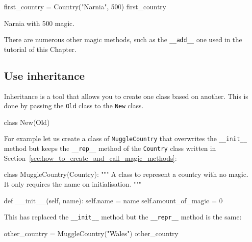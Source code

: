 \begin{pyin}
first_country = Country("Narnia", 500)
first_country
\end{pyin}





\begin{raw}
Narnia with 500 magic.
\end{raw}





There are numerous other magic methods, such as the \texttt{\_\_add\_\_} one used in
the tutorial of this Chapter.


\subsection{Use inheritance}
\label{sec:how_to_use_inheritance}

Inheritance is a tool that allows you to create one class based on another. This
is done by passing the \texttt{Old} class to the \texttt{New} class.


\begin{pyin}
class New(Old)
\end{pyin}



For example let us create a class of \texttt{MuggleCountry} that overwrites the
\texttt{\_\_init\_\_} method but keeps the \texttt{\_\_rep\_\_} method of the
\texttt{Country} class written
in Section~\ref{sec:how_to_create_and_call_magic_methods}:




\begin{pyin}
class MuggleCountry(Country):
    """
    A class to represent a country with no magic. It only requires the name on
    initialisation.
    """

    def __init__(self, name):
        self.name = name
        self.amount_of_magic = 0
\end{pyin}





This has replaced the \texttt{\_\_init\_\_} method but the \texttt{\_\_repr\_\_} method is the same:




\begin{pyin}
other_country = MuggleCountry("Wales")
other_country
\end{pyin}





